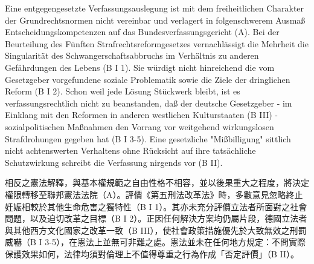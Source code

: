 \documentclass[12pt]{article}
\begin{document}
\syncleft
\begin{sourcepara}
Eine entgegengesetzte Verfassungsauslegung ist mit dem freiheitlichen Charakter der Grundrechtsnormen nicht vereinbar und verlagert in folgenschwerem Ausmaß Entscheidungskompetenzen auf das Bundesverfassungsgericht (A). Bei der Beurteilung des Fünften Strafrechtsreformgesetzes vernachlässigt die Mehrheit die Singularität des Schwangerschaftsabbruchs im Verhältnis zu anderen Gefährdungen des Lebens (B I 1). Sie würdigt nicht hinreichend die vom Gesetzgeber vorgefundene soziale Problematik sowie die Ziele der dringlichen Reform (B I 2). Schon weil jede Lösung Stückwerk bleibt, ist es verfassungsrechtlich nicht zu beanstanden, daß der deutsche Gesetzgeber - im Einklang mit den Reformen in anderen westlichen Kulturstaaten (B III) - sozialpolitischen Maßnahmen den Vorrang vor weitgehend wirkungslosen Strafdrohungen gegeben hat (B I 3-5). Eine gesetzliche "Mißbilligung" sittlich nicht achtenswerten Verhaltens ohne Rücksicht auf ihre tatsächliche Schutzwirkung schreibt die Verfassung nirgends vor (B II).
\end{sourcepara}
\begin{transpara}
相反之憲法解釋，與基本權規範之自由性格不相容，並以後果重大之程度，將決定權限轉移至聯邦憲法法院（A）。評價《第五刑法改革法》時，多數意見忽略終止妊娠相較於其他生命危害之獨特性（B I 1）。其亦未充分評價立法者所面對之社會問題，以及迫切改革之目標（B I 2）。正因任何解決方案均仍屬片段，德國立法者與其他西方文化國家之改革一致（B III），使社會政策措施優先於大致無效之刑罰威嚇（B I 3-5），在憲法上並無可非難之處。憲法並未在任何地方規定：不問實際保護效果如何，法律均須對倫理上不值得尊重之行為作成「否定評價」（B II）。
\end{transpara}
\end{document}
